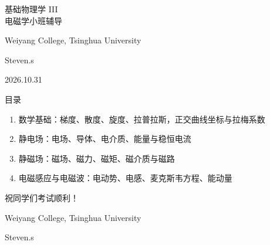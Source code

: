 \documentclass[aspectratio=169,11pt,fontset=none]{ctexbeamer}
\begin{document}
\begin{frame}[plain]
\centering
{\fontsize{32}{42}\selectfont\color{courseblue}基础物理学 III\\电磁学小班辅导\par}
\vspace{0.8cm}
{\large Weiyang College, Tsinghua University\par}
\vspace{0.28cm}
{\Large Steven.s\par}
\vspace{0.5cm}
{2026.10.31}
\end{frame}
\begin{frame}{目录}
\begin{enumerate}
\item 数学基础：梯度、散度、旋度、拉普拉斯，正交曲线坐标与拉梅系数
\item 静电场：电场、导体、电介质、能量与稳恒电流
\item 静磁场：磁场、磁力、磁矩、磁介质与磁路
\item 电磁感应与电磁波：电动势、电感、麦克斯韦方程、能动量
\end{enumerate}

\end{frame}




\begin{frame}[plain]
\centering
\vspace*{\fill}
{\fontsize{36}{48}\selectfont\color{courseblue}祝同学们考试顺利！\par}
\vspace{0.85cm}
{\large Weiyang College, Tsinghua University\par}
\vspace{0.22cm}
Steven.s\par
\vspace*{\fill}
\end{frame}
\end{document}
